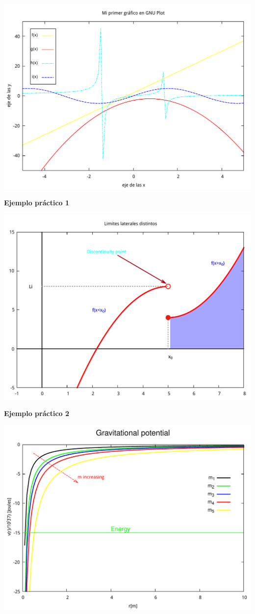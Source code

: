 \documentclass[11.5pt,a4paper]{article}
\begin{document}
\includegraphics[scale=0.35]{ejemplo3.pdf} 

\textbf{Ejemplo práctico 1}

\includegraphics[scale=0.35]{ejemplo4.pdf} 

\textbf{Ejemplo práctico 2}

\includegraphics[scale=0.35]{ejemplo5.pdf} 
 
\end{document}
